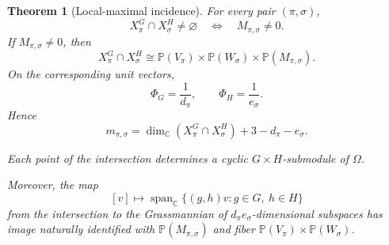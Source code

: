 \documentclass[10pt]{amsart}
\newtheorem{theorem}{Theorem}[section]
\theoremstyle{remark}
\DeclareMathOperator{\Span}{span}
\newcommand{\C}{\mathbb C}
\newcommand{\PP}{\mathbb P}
\begin{document}
\begin{theorem}[Local-maximal incidence]\label{thm:incidence}
For every pair $(\pi,\sigma)$,
\[
 X_\pi^G\cap X_\sigma^H\ne\varnothing
 \quad\Longleftrightarrow\quad
 M_{\pi,\sigma}\ne0.
\]
If $M_{\pi,\sigma}\ne0$, then
\begin{equation}\label{eq:intersection-product}
 X_\pi^G\cap X_\sigma^H
 \cong
 \PP(V_\pi)\times\PP(W_\sigma)\times\PP(M_{\pi,\sigma}).
\end{equation}
On the corresponding unit vectors,
\begin{equation}\label{eq:heights}
 \Phi_G=\frac1{d_\pi},
 \qquad
 \Phi_H=\frac1{e_\sigma}.
\end{equation}
Hence
\begin{equation}\label{eq:multiplicity-from-dim}
 m_{\pi,\sigma}
 =\dim_{\C}(X_\pi^G\cap X_\sigma^H)+3-d_\pi-e_\sigma.
\end{equation}

Each point of the intersection determines a cyclic
$G\times H$-submodule of $\Omega$.

Moreover, the map
\begin{equation}\label{eq:cyclic-map}
 [v]\longmapsto \Span_{\C}\{(g,h)v:g\in G,\ h\in H\}
\end{equation}
from the intersection to the Grassmannian of $d_\pi e_\sigma$-dimensional subspaces has image naturally
identified with $\PP(M_{\pi,\sigma})$ and fiber
$\PP(V_\pi)\times\PP(W_\sigma)$.
\end{theorem}
\end{document}
